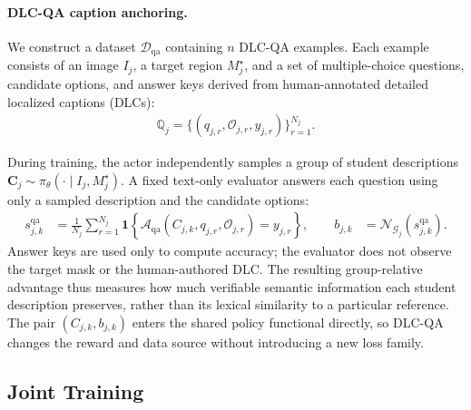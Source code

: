 \documentclass{article}
\begin{document}
\paragraph{DLC-QA caption anchoring.}
We construct a dataset $\mathcal D_{\mathrm{qa}}$ containing $n$ DLC-QA examples. Each example consists of an image $I_j$, a target region $M_j^\star$, and a set of multiple-choice questions, candidate options, and answer keys derived from human-annotated detailed localized captions (DLCs):
\begin{equation}\label{dataset:dlc-qa}\begin{aligned}
    \mathbb Q_j=\{(q_{j,r},\mathcal O_{j,r},y_{j,r})\}_{r=1}^{N_j}.
\end{aligned}\end{equation}

During training, the actor independently samples a group of student descriptions $\mathbf C_j\sim\pi_\theta(\cdot\mid I_j,M_j^\star)$. A fixed text-only evaluator answers each question using only a sampled description and the candidate options:
\begin{equation}\label{eq:dlc-qa}\begin{aligned}
 s_{j,k}^{\mathrm{qa}}&=\frac{1}{N_j}\sum_{r=1}^{N_j}
 \mathbf 1\!\left\{
 \mathcal A_{\mathrm{qa}}(C_{j,k},q_{j,r},\mathcal O_{j,r})=y_{j,r}
 \right\},\qquad
 b_{j,k}&=\mathcal N_{\mathcal G_j}(s_{j,k}^{\mathrm{qa}}).
\end{aligned}\end{equation}
Answer keys are used only to compute accuracy; the evaluator does not observe the target mask or the human-authored DLC. The resulting group-relative advantage thus measures how much verifiable semantic information each student description preserves, rather than its lexical similarity to a particular reference. The pair $(C_{j,k},b_{j,k})$ enters the shared policy functional directly, so DLC-QA changes the reward and data source without introducing a new loss family.

\subsection{Joint Training}\label{sec:joint-training}
\end{document}
